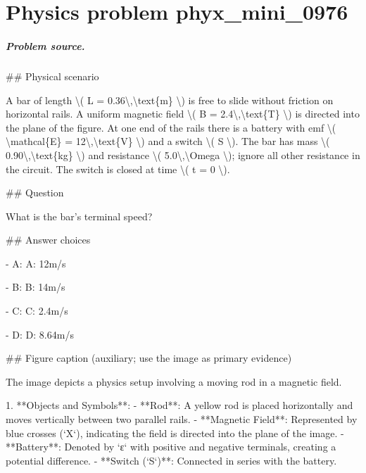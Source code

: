 
\chapter{Physics problem phyx\_mini\_0976}
\label{ch:PhyXMiniProblems_problem_phyx_mini_0976}

\paragraph{Problem source.}
\#\# Physical scenario

A bar of length \textbackslash{}( L = 0.36\textbackslash{},\textbackslash{}text\{m\} \textbackslash{}) is free to slide without friction on horizontal rails. A uniform magnetic field \textbackslash{}( B = 2.4\textbackslash{},\textbackslash{}text\{T\} \textbackslash{}) is directed into the plane of the figure. At one end of the rails there is a battery with emf \textbackslash{}( \textbackslash{}mathcal\{E\} = 12\textbackslash{},\textbackslash{}text\{V\} \textbackslash{}) and a switch \textbackslash{}( S \textbackslash{}). The bar has mass \textbackslash{}( 0.90\textbackslash{},\textbackslash{}text\{kg\} \textbackslash{}) and resistance \textbackslash{}( 5.0\textbackslash{},\textbackslash{}Omega \textbackslash{}); ignore all other resistance in the circuit. The switch is closed at time \textbackslash{}( t = 0 \textbackslash{}).

\#\# Question

What is the bar's terminal speed?

\#\# Answer choices

- A: A: 12m/s

- B: B: 14m/s

- C: C: 2.4m/s

- D: D: 8.64m/s

\#\# Figure caption (auxiliary; use the image as primary evidence)

The image depicts a physics setup involving a moving rod in a magnetic field.

1. **Objects and Symbols**:
   - **Rod**: A yellow rod is placed horizontally and moves vertically between two parallel rails.
   - **Magnetic Field**: Represented by blue crosses (`X`), indicating the field is directed into the plane of the image.
   - **Battery**: Denoted by `ε` with positive and negative terminals, creating a potential difference.
   - **Switch (`S`)**: Connected in series with the battery.


